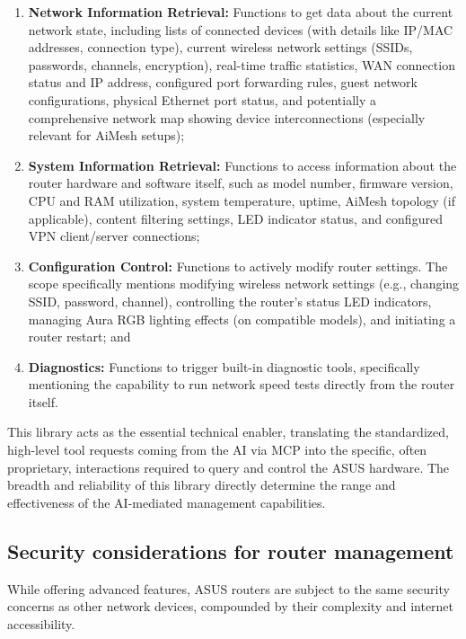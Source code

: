 \begin{enumerate}
\item \textbf{Network Information Retrieval:} Functions to get data about the current network state, including lists of connected devices (with details like IP/MAC addresses, connection type), current wireless network settings (SSIDs, passwords, channels, encryption), real-time traffic statistics, WAN connection status and IP address, configured port forwarding rules, guest network configurations, physical Ethernet port status, and potentially a comprehensive network map showing device interconnections (especially relevant for AiMesh setups);

\item \textbf{System Information Retrieval:} Functions to access information about the router hardware and software itself, such as model number, firmware version, CPU and RAM utilization, system temperature, uptime, AiMesh topology (if applicable), content filtering settings, LED indicator status, and configured VPN client/server connections;

\item \textbf{Configuration Control:} Functions to actively modify router settings. The scope specifically mentions modifying wireless network settings (e.g., changing SSID, password, channel), controlling the router's status LED indicators, managing Aura RGB lighting effects (on compatible models), and initiating a router restart; and

\item \textbf{Diagnostics:} Functions to trigger built-in diagnostic tools, specifically mentioning the capability to run network speed tests directly from the router itself.
\end{enumerate}

This library acts as the essential technical enabler, translating the standardized, high-level tool requests coming from the AI via MCP into the specific, often proprietary, interactions required to query and control the ASUS hardware. The breadth and reliability of this library directly determine the range and effectiveness of the AI-mediated management capabilities.

\subsection{Security considerations for router management}
While offering advanced features, ASUS routers are subject to the same security concerns as other network devices, compounded by their complexity and internet accessibility.

